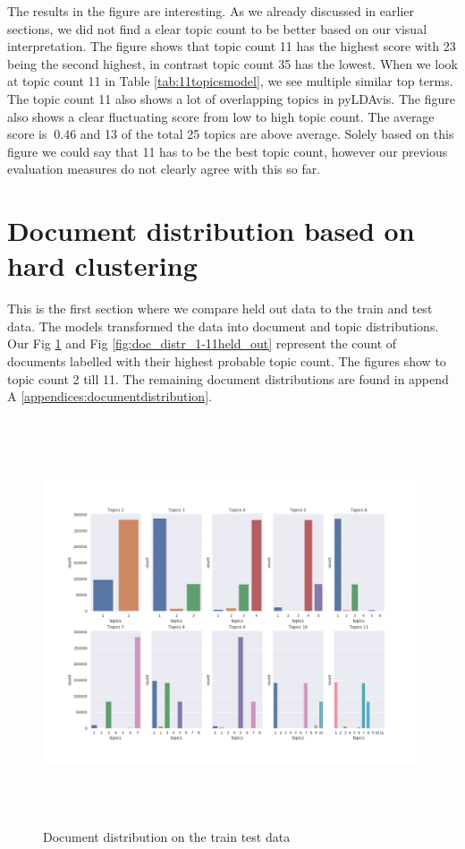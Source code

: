 The results in the figure are interesting. As we already discussed in earlier sections, we did not find a clear topic count to be better based on our visual interpretation. The figure shows that topic count 11 has the highest score with 23 being the second highest, in contrast topic count 35 has the lowest. When we look at topic count 11 in Table \ref{tab:11topicsmodel}, we see multiple similar top terms. The topic count 11 also shows a lot of overlapping topics in pyLDAvis. The figure also shows a clear fluctuating score from low to high topic count. The average score is $~0.46$ and 13 of the total 25 topics are above average. Solely based on this figure we could say that 11 has to be the best topic count, however our previous evaluation measures do not clearly agree with this so far.

\FloatBarrier
\section{Document distribution based on hard clustering}\label{results:doc_distribution}
This is the first section where we compare held out data to the train and test data. The models transformed the data into document and topic distributions. Our Fig \ref{fig:doc_distr_1-11corpus} and Fig \ref{fig:doc_distr_1-11held_out} represent the count of documents labelled with their highest probable topic count. The figures show to topic count 2 till 11. The remaining document distributions are found in append A \ref{appendices:documentdistribution}.

\begin{figure}[h]
    \centering
    \includegraphics[width=16cm, height=12cm]{figures/doc_distr/doc_distribution_1-11_corpus.png}
    \caption{Document distribution on the train test data}
    \label{fig:doc_distr_1-11corpus}
\end{figure}
\FloatBarrier

